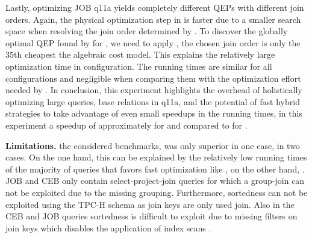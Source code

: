 Lastly, optimizing JOB q11a yields completely different QEPs with different join orders.  Again, the physical optimization step in \split is faster due to a smaller search space when resolving the join order determined by \PEall.  To discover the globally optimal QEP found by \holistic for \DPccp{} , we need to apply , \ie the chosen join order is only the 35th cheapest \wrt the algebraic cost model.  This explains the relatively large optimization time in  configuration.  The running times are similar for all configurations and negligible when comparing them with the optimization effort needed by \holistic{}.  In conclusion, this experiment highlights the overhead of holistically optimizing large queries,  base relations in q11a, and the potential of fast hybrid strategies to take advantage of even small speedups in the running times, \eg in this experiment a speedup of approximately  for \topk and \holistic compared to \split for \DPccp{} .


\textbf{Limitations.}
 the considered benchmarks, \holistic was only superior in one case, \topk{}  in two cases.  On the one hand, this can be explained by the relatively low running times of the majority of queries that favors fast optimization like \split, on the other hand, .
JOB and CEB only contain select-project-join queries for which a group-join can not be exploited due to the missing grouping.  Furthermore, sortedness can not be exploited using the TPC-H schema as join keys are only used  join.  Also in the CEB and JOB queries sortedness is difficult to exploit due to missing filters on join keys which disables the application of index scans .

